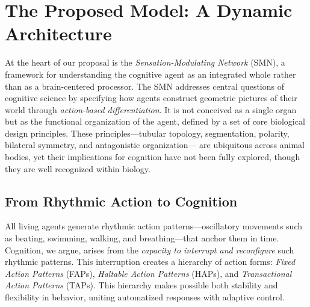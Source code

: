 
\section{The Proposed Model: A Dynamic Architecture}
\label{sec:model}

At the heart of our proposal is the \emph{Sensation-Modulating Network} (SMN), 
a framework for understanding the cognitive agent as an integrated whole rather than 
as a brain-centered processor. The SMN addresses central questions of cognitive science 
by specifying how agents construct geometric pictures of their world through 
\emph{action-based differentiation}. It is not conceived as a single organ but as the 
functional organization of the agent, defined by a set of core biological design principles. 
These principles—tubular topology, segmentation, polarity, bilateral symmetry, and antagonistic organization—
are ubiquitous across animal bodies, yet their implications 
for cognition have not been fully explored, though they are well recognized within biology.

\subsection{From Rhythmic Action to Cognition}
All living agents generate rhythmic action patterns—oscillatory movements such as beating, 
swimming, walking, and breathing—that anchor them in time. Cognition, we argue, arises from 
the \emph{capacity to interrupt and reconfigure} such rhythmic patterns. This interruption 
creates a hierarchy of action forms: 
\emph{Fixed Action Patterns} (FAPs), \emph{Haltable Action Patterns} (HAPs), and 
\emph{Transactional Action Patterns} (TAPs). 
This hierarchy makes possible both stability and flexibility in behavior, uniting 
automatized responses with adaptive control. 

